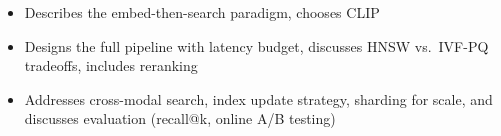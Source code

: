 \begin{interviewq}

\goodgreat
\begin{itemize}
    \item {} Describes the embed-then-search paradigm, chooses CLIP
    \item {} Designs the full pipeline with latency budget, discusses HNSW vs.\ IVF-PQ tradeoffs, includes reranking
    \item {} Addresses cross-modal search, index update strategy, sharding for scale, and discusses evaluation (recall@k, online A/B testing)
\end{itemize}

\end{interviewq}

